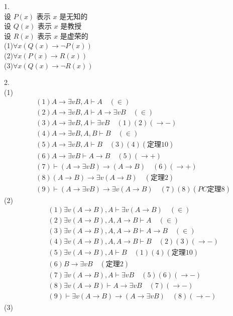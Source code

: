 \documentclass{article}
\begin{document}
1.\\
设 $P(x)$ 表示 $x$ 是无知的 \\
设 $Q(x)$ 表示 $x$ 是教授 \\
设 $R(x)$ 表示 $x$ 是虚荣的 \\
(1)$\forall x (Q(x) \to \neg P(x))$ \\
(2)$\forall x (P(x) \to R(x))$ \\
(3)$\forall x (Q(x) \to \neg R(x))$ 

2.\\
(1)
\[
\begin{aligned}
&(1)A \to \exists v B, A \vdash A \quad (\in) \\
&(2)A \to \exists v B, A \vdash A \to \exists v B \quad (\in) \\
&(3)A \to \exists v B, A \vdash \exists v B \quad (1)(2)(\to -) \\
&(4)A \to \exists v B, A, B \vdash B \quad (\in) \\
&(5)A \to \exists v B, A \vdash B \quad (3)(4)(\mbox{定理}10) \\
&(6)A \to \exists v B \vdash A \to B \quad (5)(\to +) \\
&(7)\vdash (A \to \exists v B) \to (A \to B) \quad (6)(\to +) \\
&(8)(A \to B) \to \exists v (A \to B) \quad (\mbox{定理}2) \\
&(9)\vdash (A \to \exists v B) \to \exists v (A \to B) \quad (7)(8)(PC\mbox{定理}8)
\end{aligned}    
\]
(2)
\[
\begin{aligned}
&(1)\exists v (A \to B), A \vdash \exists v (A \to B) \quad (\in) \\
&(2)\exists v (A \to B), A, A \to B \vdash A \quad (\in) \\
&(3)\exists v (A \to B), A, A \to B \vdash A \to B \quad (\in) \\
&(4)\exists v (A \to B), A, A \to B \vdash B \quad (2)(3)(\to -) \\
&(5)\exists v (A \to B), A \vdash B \quad (1)(4)(\mbox{定理}10) \\
&(6)B \to \exists v B \quad (\mbox{定理}2) \\
&(7)\exists v (A \to B), A \vdash \exists v B \quad (5)(6)(\to -) \\
&(8)\exists v (A \to B) \vdash A \to \exists v B \quad (7)(\to -) \\
&(9)\vdash \exists v (A \to B) \to (A \to \exists v B) \quad (8)(\to -)
\end{aligned}    
\]
(3)
\end{document}
